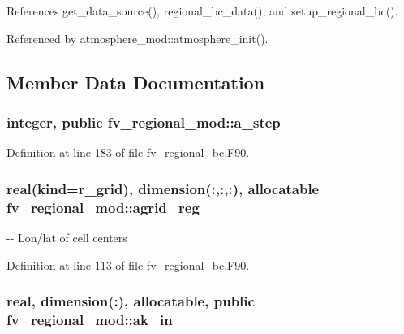 References get\-\_\-data\-\_\-source(), regional\-\_\-bc\-\_\-data(), and setup\-\_\-regional\-\_\-bc().



Referenced by atmosphere\-\_\-mod\-::atmosphere\-\_\-init().



\subsection{Member Data Documentation}
\subsubsection[{a\-\_\-step}]{\setlength{\rightskip}{0pt plus 5cm}integer, public fv\-\_\-regional\-\_\-mod\-::a\-\_\-step}\label{classfv__regional__mod_a7d48ecf3376e882113cf29f2c50b996c}


Definition at line 183 of file fv\-\_\-regional\-\_\-bc.\-F90.

\subsubsection[{agrid\-\_\-reg}]{\setlength{\rightskip}{0pt plus 5cm}real(kind=r\-\_\-grid), dimension(\-:,\-:,\-:), allocatable fv\-\_\-regional\-\_\-mod\-::agrid\-\_\-reg\hspace{0.3cm}{\ttfamily [private]}}\label{classfv__regional__mod_a2eb428ec6f0a4e8830a8c379986c760c}


-\/-\/ Lon/lat of cell centers 



Definition at line 113 of file fv\-\_\-regional\-\_\-bc.\-F90.

\subsubsection[{ak\-\_\-in}]{\setlength{\rightskip}{0pt plus 5cm}real, dimension(\-:), allocatable, public fv\-\_\-regional\-\_\-mod\-::ak\-\_\-in}\label{classfv__regional__mod_a75a74e2d8e60bc9cb7b1026601fbab5a}



